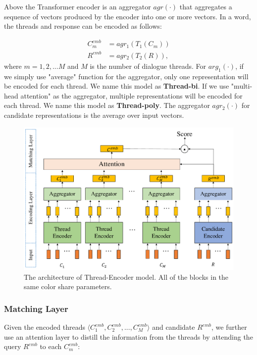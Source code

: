 Above the Transformer encoder is an aggregator $agr(\cdot)$ that aggregates
a sequence of vectors produced by the encoder into one or more vectors. 
In a word, the threads and response can be encoded as follows:

\begin{equation}
\begin{aligned}
C^{emb}_m&=agr_1(T_1(C_m))\\
R^{emb}&=agr_2(T_2(R)),
\end{aligned}
\label{eq:agr}
\end{equation}
where $m=1,2,...M$ and $M$ is the number of dialogue threads. For $arg_1(\cdot)$, if we simply use "average" function for the aggregator, only one representation will be encoded for each thread. We name this model as \textbf{Thread-bi}. If we use "multi-head attention" as the aggregator, multiple representations will be encoded for each thread. We name this model as \textbf{Thread-poly}. The aggregator $agr_2(\cdot)$ for candidate representations is the average over input vectors.


\begin{figure}
	\centering
	\includegraphics[scale=0.34]{pic/model-2.pdf}
	\caption{The architecture of Thread-Encoder model. All of the blocks in the same color share parameters.}
	\label{fig:model1}
\end{figure}

\subsubsection{Matching Layer}

Given the encoded threads $\langle C^{emb}_1, C^{emb}_2, ..., C^{emb}_M\rangle$ and candidate $R^{emb}$, we further use an attention layer to distill the information from the threads by attending the query $R^{emb}$ to each $C_m^{emb}$:

